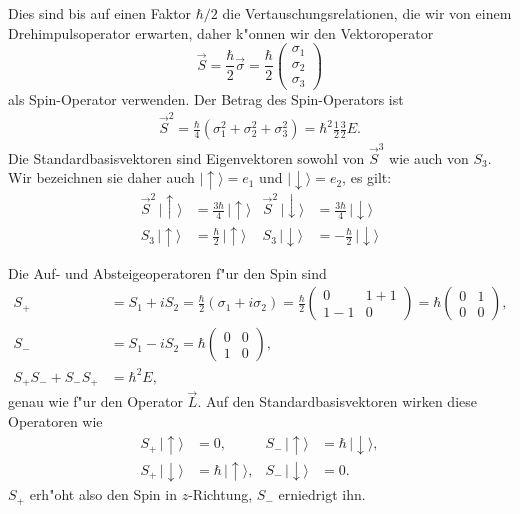 Dies sind bis auf einen Faktor $\hbar/2$ die Vertauschungsrelationen,
die wir von einem Drehimpulsoperator erwarten,
daher k"onnen wir den Vektoroperator
\begin{equation}
\vec S=\frac{\hbar}2\vec\sigma
=
\frac{\hbar}2\begin{pmatrix}\sigma_1\\\sigma_2\\\sigma_3\end{pmatrix}
\label{spin:vektoroperator}
\end{equation}
als Spin-Operator verwenden.
Der Betrag des Spin-Operators ist
\begin{align*}
\vec S^2
=
\frac{\hbar}{4}(\sigma_1^2+\sigma_2^2+\sigma_3^2)=\hbar^2\frac12\frac32E.
\end{align*}
Die Standardbasisvektoren sind Eigenvektoren sowohl von $\vec S^3$ wie
auch von $S_3$.
Wir bezeichnen sie daher auch $|\uparrow\rangle=e_1$ und
$|\downarrow\rangle=e_2$, es gilt:
\begin{align*}
\vec S^2\,|\uparrow\rangle&=\frac{3\hbar}4\,|\uparrow\rangle
&
\vec S^2\,|\downarrow\rangle&=\frac{3\hbar}4\,|\downarrow\rangle
\\
S_3\,|\uparrow\rangle&=\frac{\hbar}{2}\,|\uparrow\rangle
&
S_3\,|\downarrow\rangle&=-\frac{\hbar}{2}\,|\downarrow\rangle
\end{align*}

Die Auf- und Absteigeoperatoren f"ur den Spin sind
\begin{align}
S_+
&=
S_1+iS_2
=
\frac{\hbar}2
(\sigma_1+i\sigma_2)
=
\frac{\hbar}2
\begin{pmatrix} 0&1+1\\1-1&0 \end{pmatrix}
=\hbar\begin{pmatrix}0&1\\0&0\end{pmatrix},
\\
S_-
&=
S_1-iS_2
=
\hbar\begin{pmatrix} 0&0\\1&0\end{pmatrix},
\\
S_+S_-+S_-S_+
&=
\hbar^2E,
\end{align}
genau wie f"ur den Operator $\vec L$.
Auf den Standardbasisvektoren wirken diese Operatoren wie
\begin{align*}
S_+\,|\uparrow\rangle&=0,
&
S_-\,|\uparrow\rangle&=\hbar\,|\downarrow\rangle,
\\
S_+\,|\downarrow\rangle&=\hbar\,|\uparrow\rangle,
&
S_-\,|\downarrow\rangle&=0.
\end{align*}
$S_+$ erh"oht also den Spin in $z$-Richtung, $S_-$ erniedrigt ihn.

